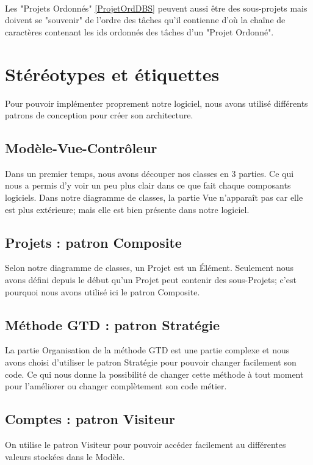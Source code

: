 \paragraph*{}
Les "Projets Ordonnés" \ref{ProjetOrdDBS} peuvent aussi être des sous-projets mais doivent se "souvenir" de l'ordre des tâches qu'il contienne d'où la chaîne de caractères contenant les ids ordonnés des tâches d'un "Projet Ordonné".


\section{Stéréotypes et étiquettes}
Pour pouvoir implémenter proprement notre logiciel, nous avons utilisé différents patrons de conception pour créer son architecture.


	\subsection{Modèle-Vue-Contrôleur}
	Dans un premier temps, nous avons découper nos classes en 3 parties. Ce qui nous a permis d'y voir un peu plus clair dans ce que fait chaque composants logiciels. Dans notre diagramme de classes, la partie Vue n'apparaît pas car elle est plus extérieure; mais elle est bien présente dans notre logiciel. 
	
	\subsection{Projets : patron Composite}
	Selon notre diagramme de classes, un Projet est un Élément. Seulement nous avons défini depuis le début qu'un Projet peut contenir des sous-Projets; c'est pourquoi nous avons utilisé ici le patron Composite.
	
	\subsection{Méthode GTD : patron Stratégie}
	La partie Organisation de la méthode GTD est une partie complexe et nous avons choisi d'utiliser le patron Stratégie pour pouvoir changer facilement son code. Ce qui nous donne la possibilité de changer cette méthode à tout moment pour l'améliorer ou changer complètement son code métier.
	
	\subsection{Comptes : patron Visiteur}
	On utilise le patron Visiteur pour pouvoir accéder facilement au différentes valeurs stockées dans le Modèle.
	



